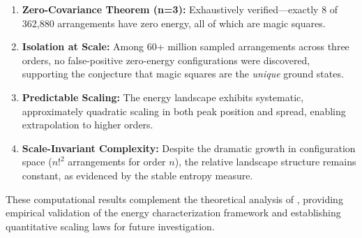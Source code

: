 \begin{enumerate}
\item \textbf{Zero-Covariance Theorem (n=3):} Exhaustively verified---exactly 8 of 362,880 
arrangements have zero energy, all of which are magic squares.

\item \textbf{Isolation at Scale:} Among 60+ million sampled arrangements across three orders,
no false-positive zero-energy configurations were discovered,
supporting the conjecture that magic squares are the \emph{unique} ground states.

\item \textbf{Predictable Scaling:} The energy landscape exhibits systematic, 
approximately quadratic scaling in both peak position and spread,
enabling extrapolation to higher orders.

\item \textbf{Scale-Invariant Complexity:} Despite the dramatic growth in configuration space
($n!^2$ arrangements for order $n$), the relative landscape structure remains constant,
as evidenced by the stable entropy measure.
\end{enumerate}

These computational results complement the theoretical analysis of ,
providing empirical validation of the energy characterization framework
and establishing quantitative scaling laws for future investigation.
